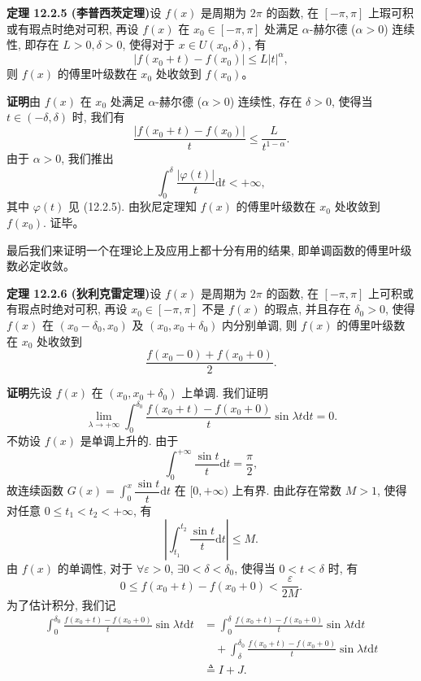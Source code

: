 \documentclass[UTF8,12pt,a4paper,fontset=fandol]{ctexart}
\begin{document}
\noindent\textbf{定理 12.2.5 (李普西茨定理)}\quad 设 $f(x)$ 是周期为 $2\pi$ 的函数, 在 $[-\pi,\pi]$ 上瑕可积或有瑕点时绝对可积, 再设 $f(x)$ 在 $x_0\in[-\pi,\pi]$ 处满足 $\alpha$-赫尔德 ($\alpha>0$) 连续性, 即存在 $L>0,\delta>0$, 使得对于 $x\in U(x_0,\delta)$, 有
\[
  |f(x_0+t)-f(x_0)|\leqslant L|t|^\alpha,
\]
则 $f(x)$ 的傅里叶级数在 $x_0$ 处收敛到 $f(x_0)$。

\noindent\textbf{证明}\quad 由 $f(x)$ 在 $x_0$ 处满足 $\alpha$-赫尔德 ($\alpha>0$) 连续性, 存在 $\delta>0$, 使得当 $t\in(-\delta,\delta)$ 时, 我们有
\[
  \frac{|f(x_0+t)-f(x_0)|}{t}\leqslant\frac{L}{t^{1-\alpha}}.
\]
由于 $\alpha>0$, 我们推出
\[
  \int_0^\delta\frac{|\varphi(t)|}{t}\mathrm dt<+\infty,
\]
其中 $\varphi(t)$ 见 (12.2.5). 由狄尼定理知 $f(x)$ 的傅里叶级数在 $x_0$ 处收敛到 $f(x_0)$. 证毕。

最后我们来证明一个在理论上及应用上都十分有用的结果, 即单调函数的傅里叶级数必定收敛。

\noindent\textbf{定理 12.2.6 (狄利克雷定理)}\quad 设 $f(x)$ 是周期为 $2\pi$ 的函数, 在 $[-\pi,\pi]$ 上可积或有瑕点时绝对可积, 再设 $x_0\in[-\pi,\pi]$ 不是 $f(x)$ 的瑕点, 并且存在 $\delta_0>0$, 使得 $f(x)$ 在 $(x_0-\delta_0,x_0)$ 及 $(x_0,x_0+\delta_0)$ 内分别单调, 则 $f(x)$ 的傅里叶级数在 $x_0$ 处收敛到
\[
  \frac{f(x_0-0)+f(x_0+0)}{2}.
\]

\noindent\textbf{证明}\quad 先设 $f(x)$ 在 $(x_0,x_0+\delta_0)$ 上单调. 我们证明
\begin{equation}
  \lim_{\lambda\to+\infty}\int_0^{\delta_0}
  \frac{f(x_0+t)-f(x_0+0)}{t}\sin\lambda t\mathrm dt=0.
  \tag{12.2.6}
\end{equation}
不妨设 $f(x)$ 是单调上升的. 由于
\[
  \int_0^{+\infty}\frac{\sin t}{t}\mathrm dt=\frac{\pi}{2},
\]
故连续函数 $G(x)=\displaystyle\int_0^x\dfrac{\sin t}{t}\mathrm dt$ 在 $[0,+\infty)$ 上有界. 由此存在常数 $M>1$, 使得对任意 $0\leqslant t_1<t_2<+\infty$, 有
\[
  \left|\int_{t_1}^{t_2}\frac{\sin t}{t}\mathrm dt\right|\leqslant M.
\]
由 $f(x)$ 的单调性, 对于 $\forall\varepsilon>0$, $\exists 0<\delta<\delta_0$, 使得当 $0<t<\delta$ 时, 有
\[
  0\leqslant f(x_0+t)-f(x_0+0)<\frac{\varepsilon}{2M}.
\]
为了估计积分, 我们记
\[
\begin{aligned}
  \int_0^{\delta_0}\frac{f(x_0+t)-f(x_0+0)}{t}\sin\lambda t\mathrm dt
  &=
  \int_0^\delta\frac{f(x_0+t)-f(x_0+0)}{t}\sin\lambda t\mathrm dt\\
  &\quad+
  \int_\delta^{\delta_0}\frac{f(x_0+t)-f(x_0+0)}{t}\sin\lambda t\mathrm dt\\
  &\triangleq I+J.
\end{aligned}
\]
\end{document}
